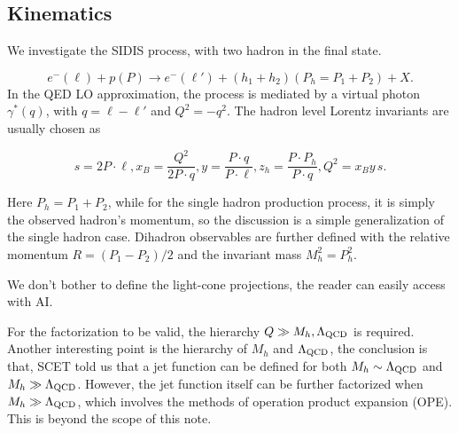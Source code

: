 \documentclass[a4paper,11pt]{article}
\begin{document}
\subsection{Kinematics}
We investigate the SIDIS process, with two hadron in the final state.

\begin{equation}
    e^-(\ell)+p(P)\to e^-(\ell')+(h_1+h_2)(P_h=P_1+P_2)+X .
    \label{eq:sidis-process}
\end{equation}
In the QED LO approximation, the process is mediated by a virtual photon $\gamma^*(q)$, with $q=\ell-\ell'$ and $Q^2=-q^2$.
The hadron level Lorentz invariants are usually chosen as

\begin{equation}
    s=2P\cdot\ell,
    x_B=\frac{Q^2}{2P\cdot q}, y=\frac{P\cdot q}{P\cdot\ell},
    z_h=\frac{P\cdot P_h}{P\cdot q},Q^2=x_By\,s.
    \label{eq:sidis-kinematics}
\end{equation}

Here $P_h = P_1 + P_2$, while for the single hadron production process, it is simply the observed hadron's momentum, so the discussion is a simple generalization of the single hadron case.
%
Dihadron observables are further defined with the relative momentum $R=(P_1-P_2)/2$ and the invariant mass $M_h^2=P_h^2$.

We don't bother to define the light-cone projections, the reader can easily access with AI.

For the factorization to be valid, the hierarchy $Q\gg M_h,\Lambda_{\rm QCD}$ is required.
Another interesting point is the hierarchy of $M_h$ and $\Lambda_{\rm QCD}$, the conclusion is that, SCET told us that a jet function can be defined for both $M_h\sim\Lambda_{\rm QCD}$ and $M_h\gg\Lambda_{\rm QCD}$. However, the jet function itself can be further factorized when $M_h\gg\Lambda_{\rm QCD}$, which involves the methods of operation product expansion (OPE). This is beyond the scope of this note.
\end{document}
